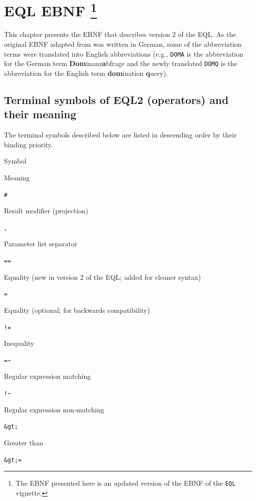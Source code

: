 \documentclass[]{book}
\let\rmarkdownfootnote\footnote%
\def\footnote{\protect\rmarkdownfootnote}
\theoremstyle{definition}
\theoremstyle{definition}
\theoremstyle{definition}
\theoremstyle{remark}
\begin{document}
\hypertarget{app-chap:EQL-EBNF}{%
\chapter[EQL EBNF ]{\texorpdfstring{EQL EBNF \footnote{The EBNF
  presented here is an updated version of the EBNF of the \texttt{EQL}
  vignette.}}{EQL EBNF }}\label{app-chap:EQL-EBNF}}

This chapter presents the EBNF \citep{garshol:2003a} that describes
version 2 of the EQL. As the original EBNF adapted from
\citet{john:2012a} was written in German, some of the abbreviation terms
were translated into English abbreviations (e.g., \texttt{DOMA} is the
abbreviation for the German term \textbf{Dom}inanz\textbf{a}bfrage and
the newly translated \texttt{DOMQ} is the abbreviation for the English
term \textbf{dom}ination \textbf{q}uery).

\hypertarget{terminal-symbols-of-eql2-operators-and-their-meaning}{%
\section{Terminal symbols of EQL2 (operators) and their
meaning}\label{terminal-symbols-of-eql2-operators-and-their-meaning}}

The terminal symbols described below are listed in descending order by
their binding priority.

Symbol

Meaning

\texttt{\#}

Result modifier (projection)

\texttt{,}

Parameter list separator

\texttt{==}

Equality (new in version 2 of the EQL; added for cleaner syntax)

\texttt{=}

Equality (optional; for backwards compatibility)

\texttt{!=}

Inequality

\texttt{=\textasciitilde{}}

Regular expression matching

\texttt{!\textasciitilde{}}

Regular expression non-matching

\texttt{\&gt;}

Greater than

\texttt{\&gt;=}
\end{document}

